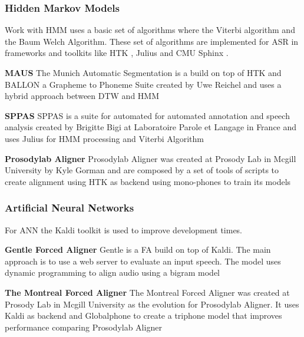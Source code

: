 \subsubsection{Hidden Markov Models}

Work with HMM uses a basic set of algorithms where the Viterbi algorithm \cite{Forney1973TheAlgorithm} and the Baum Welch Algorithm. These set of algorithms are implemented for ASR in frameworks and toolkits like HTK \cite{Young1994ThePhilosophy}, Julius \cite{LeeEurospeechEngine} and CMU Sphinx \cite{Lee1990AnSystem}.

\textbf{MAUS}
The Munich Automatic Segmentation \cite{WesenickAPPLYINGPRONUNCIATION} is a build on top of HTK and BALLON a Grapheme to Phoneme Suite created by Uwe Reichel and uses a hybrid approach between DTW and HMM

\textbf{SPPAS}
SPPAS \cite{Bigi2016ASPPAS} is a suite for automated for automated annotation and speech analysis created by Brigitte Bigi at Laboratoire Parole et Langage in France and uses Julius for HMM processing and Viterbi Algorithm

\textbf{Prosodylab Aligner}
Prosodylab Aligner \cite{Gorman2011Prosodylab-aligner:Speech} was created at Prosody Lab in Mcgill University by Kyle Gorman and are composed by a set of tools of scripts to create alignment using HTK as backend using mono-phones to train its models

\subsubsection{Artificial Neural Networks}

For ANN the Kaldi toolkit \cite{Povey_ASRU2011} is used to improve development times.   

\textbf{Gentle Forced Aligner}
Gentle \cite{gentle} is a FA build on top of Kaldi. The main approach is to use a web server to evaluate an input speech. The model uses dynamic programming to align audio using a bigram model

\textbf{The Montreal Forced Aligner}
The Montreal Forced Aligner \cite{McAuliffe2017MontrealKaldi} was created at Prosody Lab in Mcgill University as the evolution for Prosodylab Aligner. It uses Kaldi as backend and Globalphone to create a triphone model that improves performance comparing Prosodylab Aligner

